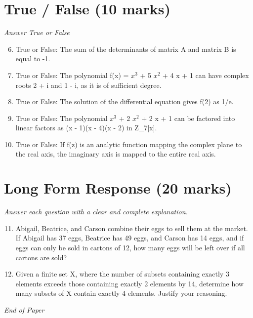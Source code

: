 \documentclass[12pt]{article}
\begin{document}
\section*{True / False (10 marks)}
\textit{Answer True or False}
\begin{enumerate}[label=\arabic*.]
\setcounter{enumi}{5}
\item True or False: The sum of the determinants of matrix A and matrix B is equal to -1.
\item True or False: The polynomial f(x) = $x^3$ + 5 $x^2$ + 4 x + 1 can have complex roots 2 + i and 1 - i, as it is of sufficient degree.
\item True or False: The solution of the differential equation gives f(2) as 1/e.
\item True or False: The polynomial $x^3$ + 2 $x^2$ + 2 x + 1 can be factored into linear factors as (x - 1)(x - 4)(x - 2) in Z\_7[x].
\item True or False: If f(z) is an analytic function mapping the complex plane to the real axis, the imaginary axis is mapped to the entire real axis.
\end{enumerate}

\section*{Long Form Response (20 marks)}
\textit{Answer each question with a clear and complete explanation.}
\begin{enumerate}[label=\arabic*.]
\setcounter{enumi}{10}
\item Abigail, Beatrice, and Carson combine their eggs to sell them at the market. If Abigail has 37 eggs, Beatrice has 49 eggs, and Carson has 14 eggs, and if eggs can only be sold in cartons of 12, how many eggs will be left over if all cartons are sold?
\item Given a finite set X, where the number of subsets containing exactly 3 elements exceeds those containing exactly 2 elements by 14, determine how many subsets of X contain exactly 4 elements. Justify your reasoning.
\end{enumerate}

\vfill
\noindent\textit{End of Paper}
\end{document}
